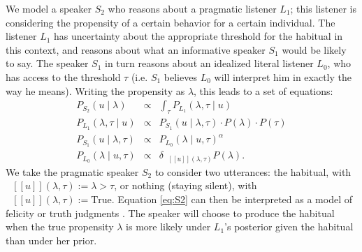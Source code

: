 \documentclass[10pt,letterpaper]{article}
\newcommand{\denote}[1]{\mbox{ $[\![ #1 ]\!]$}}
\newcommand{\ndg}[1]{\textcolor{Green}{[ndg: #1]}}
\begin{document}
We model a speaker $S_2$ who reasons about a pragmatic listener $L_1$; this listener is considering the propensity of a certain behavior for a certain individual.
The listener $L_1$ has uncertainty about the appropriate threshold for the habitual in this context, and reasons about what an informative speaker $S_1$ would be likely to say. The speaker $S_1$ in turn reasons about an idealized literal listener $L_0$, who has access to the threshold $\tau$ (i.e. $S_1$ believes $L_0$ will interpret him in exactly the way he means). 
%
Writing the propensity as $\lambda$, this leads to a set of equations:
\begin{eqnarray}
P_{S_{2}}(u \mid \lambda) & \propto &  \int_{\tau} P_{L_{1}}(\lambda , \tau \mid u) \label{eq:S2}\\
P_{L_{1}}(\lambda , \tau \mid u) &\propto& P_{S_{1}}(u \mid \lambda, \tau) \cdot P(\lambda) \cdot P(\tau) \label{eq:L1}\\
P_{S_{1}}(u \mid \lambda, \tau) &\propto&  {P_{L_{0}}(\lambda \mid u, \tau)}^{\alpha} \label{eq:S1}\\
P_{L_{0}}(\lambda \mid u, \tau) &\propto& {\delta_{\denote{u}(\lambda, \tau)} P(\lambda)}. \label{eq:L0}
\end{eqnarray}
We take the pragmatic speaker $S_2$ to consider two utterances: the habitual, with $\denote{u}(\lambda, \tau) := \lambda>\tau$, or nothing (staying silent), with $\denote{u}(\lambda, \tau) := \text{True}$.
Equation \ref{eq:S2} can then be interpreted as a model of felicity or truth judgments \cite{Degen2014, TesslerUnderReview}.
The speaker will choose to produce the habitual when the true propensity $\lambda$ is more likely under $L_1$'s posterior given the habitual than under her prior. 
\end{document}

